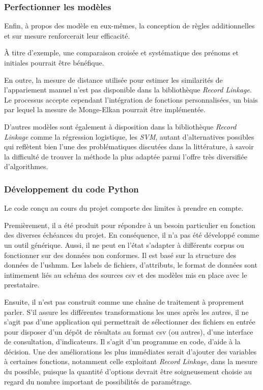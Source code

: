 \documentclass[a4paper,12pt,twoside]{book}
\begin{document}
                \subsubsection{Perfectionner les modèles}
                
                    Enfin, à propos des modèle en eux-mêmes, la conception de règles additionnelles et sur mesure renforcerait leur efficacité.
                    
                    À titre d'exemple, une comparaison croisée et systématique des prénoms et initiales pourrait être bénéfique.
                    
                    En outre, la mesure de distance utilisée pour estimer les similarités de l'appariement manuel n'est pas disponible dans la bibliothèque \textit{Record Linkage}. Le processus accepte cependant l'intégration de fonctions personnalisées, un biais par lequel la mesure de Monge-Elkan pourrait être implémentée. 
                    
                    D'autres modèles sont également à disposition  dans la bibliothèque \textit{Record Linkage} comme la régression logistique, les \textit{SVM}, autant d'alternatives possibles qui reflètent bien l'une des problématiques discutées dans la littérature, à savoir la difficulté de trouver la méthode la plus adaptée parmi l'offre très diversifiée d'algorithmes.
                
                \subsubsection{Développement du code Python}
                
                    Le code conçu au cours du projet comporte des limites à prendre en compte.
                    
                    Premièrement, il a été produit pour répondre à un besoin particulier en fonction des diverses échéances du projet. En conséquence, il n'a pas été développé comme un outil générique. Aussi, il ne peut en l'état s'adapter à différents corpus ou fonctionner sur des données non conformes. Il est basé sur la structure des données de l'\gls{ushmm}. Les labels de fichiers, d'attributs, le format de données sont intimement liés au schéma des sources \acrshort{csv} et des modèles mis en place avec le prestataire.
                    
                    Ensuite, il n'est pas construit comme une chaîne de traitement à proprement parler. S'il assure les différentes transformations les unes après les autres, il ne s'agit pas d'une application qui permettrait de sélectionner des fichiers en entrée pour disposer d'un dépôt de résultats au format \acrshort{csv} (ou autres), d'une interface de consultation, d'indicateurs. Il s'agit d'un programme en code, d'aide à la décision. Une des améliorations les plus immédiates serait d'ajouter des variables à certaines fonctions, notamment celle exploitant \textit{Record Linkage}, dans la mesure du possible, puisque la quantité d'options devrait être soigneusement choisie au regard du nombre important de possibilités de paramétrage.
                    
\end{document}
